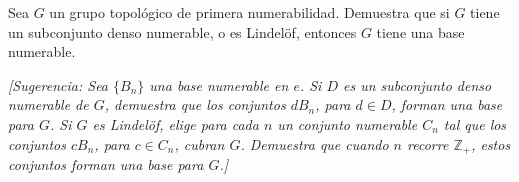 
 \item[*18.] Sea $G$ un grupo topológico de primera numerabilidad. Demuestra que si $G$ tiene un subconjunto denso numerable, o es Lindelöf, entonces $G$ tiene una base numerable.  

    \textit{[Sugerencia: Sea $\{B_n\}$ una base numerable en $e$. Si $D$ es un subconjunto denso numerable de $G$, demuestra que los conjuntos $dB_n$, para $d \in D$, forman una base para $G$.  
    Si $G$ es Lindelöf, elige para cada $n$ un conjunto numerable $C_n$ tal que los conjuntos $cB_n$, para $c \in C_n$, cubran $G$. Demuestra que cuando $n$ recorre $\mathbb{Z}_{+}$, estos conjuntos forman una base para $G$.]}
